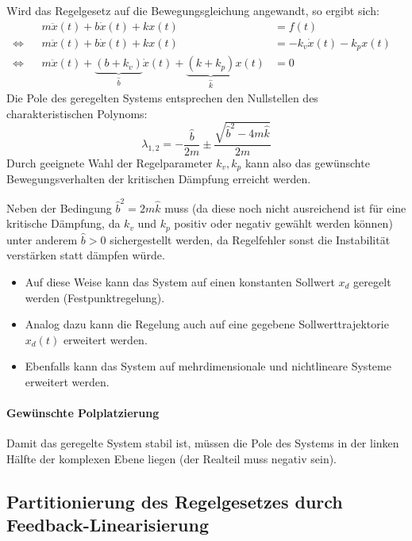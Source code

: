 			Wird das Regelgesetz auf die Bewegungsgleichung angewandt, so ergibt sich:
			\begin{align*}
				     &  & m\ddot{x}(t) + b\dot{x}(t) + kx(t)                                                                 & = f(t)                       & \\
				\iff &  & m\ddot{x}(t) + b\dot{x}(t) + kx(t)                                                                 & = -k_v \dot{x}(t) - k_p x(t) & \\
				\iff &  & m\ddot{x}(t) + \underbrace{(b + k_v)}_{\hat{b}} \dot{x}(t) + \underbrace{(k + k_p)}_{\hat{k}} x(t) & = 0                          &
			\end{align*}
			Die Pole des geregelten Systems entsprechen den Nullstellen des charakteristischen Polynoms:
			\begin{equation*}
				\lambda_{1, 2} = -\frac{\hat{b}}{2m} \pm \frac{\sqrt{\hat{b}^2 - 4m\hat{k}}}{2m}
			\end{equation*}
			Durch geeignete Wahl der Regelparameter \( k_v, k_p \) kann also das gewünschte Bewegungsverhalten der kritischen Dämpfung erreicht werden.

			Neben der Bedingung \( \hat{b}^2 = 2m\hat{k} \) muss (da diese noch nicht ausreichend ist für eine kritische Dämpfung, da \( k_v \) und \( k_p \) positiv oder negativ gewählt werden können) unter anderem \( \hat{b} > 0 \) sichergestellt werden, da Regelfehler sonst die Instabilität verstärken statt dämpfen würde.

			\begin{itemize}
				\item Auf diese Weise kann das System auf einen konstanten Sollwert \( x_d \) geregelt werden (Festpunktregelung).
				\item Analog dazu kann die Regelung auch auf eine gegebene Sollwerttrajektorie \( x_d(t) \) erweitert werden.
				\item Ebenfalls kann das System auf mehrdimensionale und nichtlineare Systeme erweitert werden.
			\end{itemize}

			\paragraph{Gewünschte Polplatzierung}
				Damit das geregelte System stabil ist, müssen die Pole des Systems in der linken Hälfte der komplexen Ebene liegen (\dh der Realteil muss negativ sein).

	\subsection{Partitionierung des Regelgesetzes durch Feedback-Linearisierung}
		\label{sec:feedbacklinearization}

